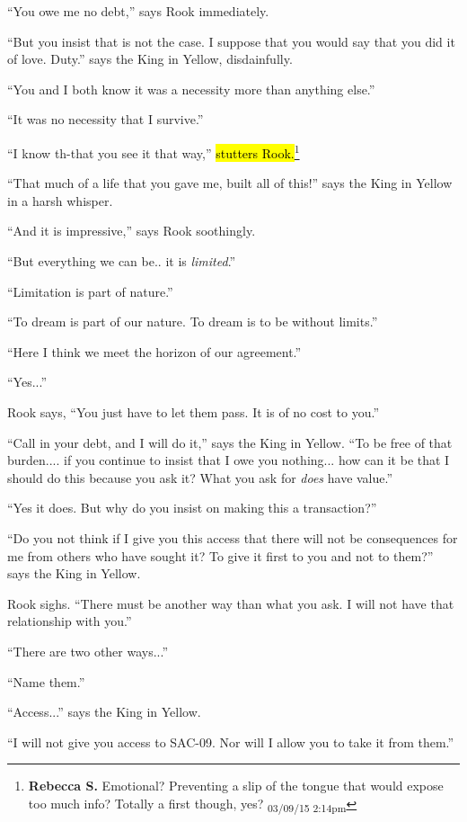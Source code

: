 ``You owe me no debt,'' says Rook immediately.

``But you insist that is not the case.  I suppose that you would say that you did it of love.  Duty.'' says the King in Yellow, disdainfully.

``You and I both know it was a necessity more than anything else.''

``It was no necessity that I survive.''

``I know th-that you see it that way,'' \hl{stutters Rook.}\footnote{\textbf{Rebecca S. }Emotional? Preventing a slip of the tongue that would expose too much info? Totally a first though, yes? \textsubscript{03/09/15 2:14pm}}

``That much of a life that you gave me, built all of this!'' says the King in Yellow in a harsh whisper.

``And it is impressive,'' says Rook soothingly.

``But everything we can be.. it is \textit{limited}.''

``Limitation is part of nature.''

``To dream is part of our nature.  To dream is to be without limits.''

``Here I think we meet the horizon of our agreement.''

``Yes...''



Rook says, ``You just have to let them pass.  It is of no cost to you.''

``Call in your debt, and I will do it,'' says the King in Yellow. ``To be free of that burden.... if you continue to insist that I owe you nothing... how can it be that I should do this because you ask it?  What you ask for \textit{does} have value.''

``Yes it does.  But why do you insist on making this a transaction?''

``Do you not think if I give you this access that there will not be consequences for me from others who have sought it?  To give it first to you and not to them?'' says the King in Yellow.

Rook sighs.  ``There must be another way than what you ask. I will not have that relationship with you.''

``There are two other ways...''

``Name them.''

``Access...'' says the King in Yellow.

``I will not give you access to SAC-09.  Nor will I allow you to take it from them.''

